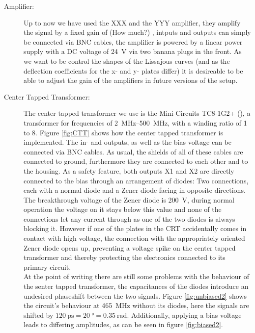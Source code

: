 \begin{description}
	\item[Amplifier:] Up to now we have used the XXX  and the YYY  amplifier, they amplify the signal by a fixed gain of (How much?) , intputs and outputs can  simply be connected via BNC cables, the amplifier is powered by a linear power supply with a DC voltage of \SI{24}{\volt} via two banana plugs in the front. As we want to be control the shapes of the Lissajous curves (and as the deflection coefficients for the x- and y- plates differ) it is desireable to be able to adjust the gain of the amplifiers in future versions of the setup. 
	\item[Center Tapped Transformer:] The center tapped transformer we use is the Mini-Circuits TC8-1G2+ (\cite{TC8-1G2}), a transformer for frequencies of \SIrange{2}{500}{\mega\hertz}, with a winding ratio of 1 to 8. Figure \ref{fig:CTT} shows how the center tapped transformer is implemented. The in- and outputs, as well as the bias voltage can be connected via BNC cables. As usual, the shields of all of these cables are connected to ground, furthermore they are connected to each other and to the housing. As a safety feature, both outputs X1 and X2 are directly connected to the bias through an arrangement of diodes: Two connections, each with a normal diode and a Zener diode facing in opposite directions. The breakthrough voltage of the Zener diode is \SI{200}{\volt}, during normal operation the voltage on it stays below this value and none of the connections let any current through as one of the two diodes is always blocking it. However if one of the plates in the CRT accidentally comes in contact with high voltage, the connection with the appropriately oriented Zener diode opens up, preventing a voltage spike on the center tapped transformer and thereby protecting the electronics connected to its primary circuit.\\
	At the point of writing there are still some problems with the behaviour of the senter tapped transformer, the capacitances of the diodes introduce an undesired phaseshift between the two signals. Figure \ref{fig:unbiased2} shows the circuit's behaviour at \SI{465}{\mega\hertz} without its diodes, here the signals are shifted by $\SI{120}{\pico\second} = \SI{20}{\degree} = \SI{0.35}{\radian}$. Additionally, applying a bias voltage leads to differing amplitudes, as can be seen in figure \ref{fig:biased2}.  

\end{description}
